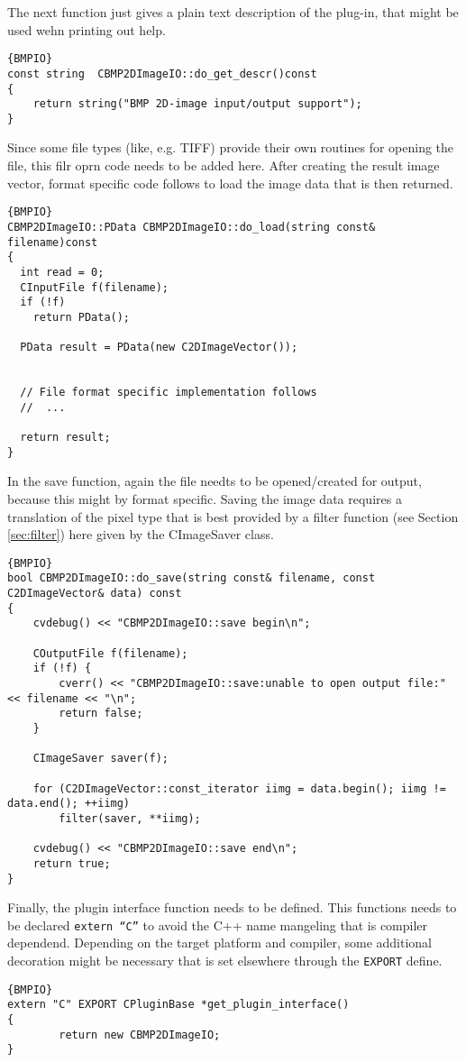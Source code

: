 \noindent 
The next function just gives a plain text description of the plug-in, that might be used wehn printing out help. 
\begin{lstlisting}{BMPIO}
const string  CBMP2DImageIO::do_get_descr()const
{
	return string("BMP 2D-image input/output support");
}
\end{lstlisting}

\noindent 
Since some file types (like, e.g. TIFF) provide their own routines for opening the file, this filr oprn code needs to be added here.
After creating the result image vector, format specific code follows to load the image data that is then returned. 
\begin{lstlisting}{BMPIO}
CBMP2DImageIO::PData CBMP2DImageIO::do_load(string const& filename)const
{
  int read = 0; 
  CInputFile f(filename);
  if (!f)
    return PData(); 

  PData result = PData(new C2DImageVector()); 

 
  // File format specific implementation follows
  //  ...
	
  return result; 
}
\end{lstlisting}

\noindent 
In the save function, again the file needts to be opened/created for output, because this might by format specific. 
Saving the image data requires a translation of the pixel type that is best provided by a filter function (see Section \ref{sec:filter}) here 
  given by the CImageSaver class.
\begin{lstlisting}{BMPIO}
bool CBMP2DImageIO::do_save(string const& filename, const C2DImageVector& data) const
{
	cvdebug() << "CBMP2DImageIO::save begin\n"; 
	
	COutputFile f(filename);
	if (!f) {
		cverr() << "CBMP2DImageIO::save:unable to open output file:" << filename << "\n"; 
		return false; 
	}
		
	CImageSaver saver(f); 
	
	for (C2DImageVector::const_iterator iimg = data.begin(); iimg != data.end(); ++iimg)
		filter(saver, **iimg); 
	
	cvdebug() << "CBMP2DImageIO::save end\n"; 
	return true; 
}
\end{lstlisting}

\noindent 
Finally, the plugin interface function needs to be defined. 
This functions needs to be declared \texttt{extern ``C''} to avoid the C++ name mangeling that is compiler dependend. 
Depending on the target platform and compiler, some additional decoration might be necessary that is set elsewhere 
  through the \texttt{EXPORT} define.
\begin{lstlisting}{BMPIO}
extern "C" EXPORT CPluginBase *get_plugin_interface()
{
		return new CBMP2DImageIO;
}
\end{lstlisting}

